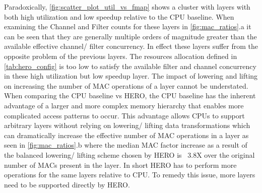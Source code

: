 Paradoxically, \autoref{fig:scatter_plot_util_vs_fmap} shows a cluster with
layers with both high utilization and low speedup relative to the CPU baseline.
When examining the Channel and Filter counts for these layers in
\autoref{fig:mac_ratios}.a it can be seen that they are generally multiple orders
of magnitude greater than the available effective channel/ filter concurrency.
In effect these layers suffer from the opposite problem of the previous layers.
The resources allocation defined in \autoref{tab:hero_config} is too low to
satisfy the available filter and channel concurrency in these high utilization
but low speedup layer. 
The impact of lowering and lifting on increasing the number of MAC operations of
a layer cannot be understated. When comparing the CPU baseline vs HERO, the CPU
baseline has the inherent advantage of a larger and more complex memory
hierarchy that enables more complicated access patterns to occur. This advantage
allows CPUs to support arbitrary layers without relying on lowering/ lifting
data transformations which can dramatically increase the effective number of MAC
operations in a layer as seen in \autoref{fig:mac_ratios}.b where the median MAC
factor increase as a result of the balanced lowering/ lifting scheme chosen by
HERO is ~3.8X over the original number of MACs present in the layer. In short
HERO has to perform more operations for the same layers relative to CPU. To
remedy this issue, more layers need to be supported directly by HERO.  

